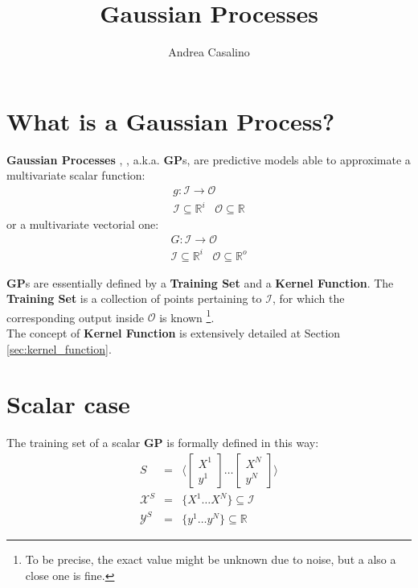 \documentclass{article}
\author{Andrea Casalino}
\title{Gaussian Processes}
\begin{document}
\maketitle

\newpage
\section{What is a Gaussian Process?}

\textbf{Gaussian Processes} \cite{GP_general_01}, \cite{GP_general_02}, a.k.a. \textbf{GP}s, are predictive models able to approximate a multivariate scalar function:
\begin{eqnarray}
g : \mathcal{I} \rightarrow \mathcal{O} \\
\mathcal{I} \subseteq \mathbb{R}^i \,\,\,\,\, \mathcal{O} \subseteq \mathbb{R}
\end{eqnarray}
or a  multivariate vectorial one:
\begin{eqnarray}
G : \mathcal{I} \rightarrow \mathcal{O} \\
\mathcal{I} \subseteq \mathbb{R}^i \,\,\,\,\, \mathcal{O} \subseteq \mathbb{R}^o 
\end{eqnarray}

\textbf{GP}s are essentially defined by a \textbf{Training Set} and a \textbf{Kernel Function}.
The \textbf{Training Set} is a collection of points pertaining to $\mathcal{I}$, for which the corresponding output inside $\mathcal{O}$ is known \footnote{To be precise, the exact value might be unknown due to noise, but a also a close one is fine.}.
\\
The concept of \textbf{Kernel Function} is extensively detailed at Section \ref{sec:kernel_function}.

\section{Scalar case}

The training set of a scalar \textbf{GP} is formally defined in this way:
\begin{eqnarray}
S &=& 
\bigg \langle 
\begin{bmatrix} X^1 \\ y^1 \end{bmatrix}
\hdots
\begin{bmatrix} X^N \\ y^N \end{bmatrix} 
\bigg \rangle \\
\mathcal{X}^S &=& \big \lbrace X^1 \hdots X^N \big \rbrace \subseteq \mathcal{I} \\
\mathcal{Y}^S &=& \big \lbrace y^1 \hdots y^N \big \rbrace \subseteq \mathbb{R}
\end{eqnarray}
\end{document}

